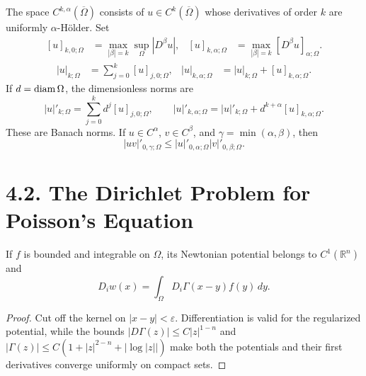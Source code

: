 \begin{definition}\label{gt:def-holder-spaces}
The space $C^{k,\alpha}(\overline\Omega)$ consists of
$u\in C^k(\overline\Omega)$ whose derivatives of order $k$ are uniformly
$\alpha$-H\"older. Set
\begin{equation}
\tag{4.5}
\begin{aligned}
[u]_{k,0;\Omega}&=\max_{|\beta|=k}\sup_\Omega|D^\beta u|,
& [u]_{k,\alpha;\Omega}&=\max_{|\beta|=k}[D^\beta u]_{\alpha;\Omega}.
\end{aligned}
\end{equation}
\begin{equation}
\tag{4.6}
\begin{aligned}
|u|_{k;\Omega}&=\sum_{j=0}^k[u]_{j,0;\Omega},
& |u|_{k,\alpha;\Omega}&=|u|_{k;\Omega}+[u]_{k,\alpha;\Omega}.
\end{aligned}
\end{equation}
If $d=\operatorname{diam}\Omega$, the dimensionless norms are
\[
|u|'_{k;\Omega}=\sum_{j=0}^k d^j[u]_{j,0;\Omega},
\qquad
|u|'_{k,\alpha;\Omega}=|u|'_{k;\Omega}
+d^{k+\alpha}[u]_{k,\alpha;\Omega}.
\tag{4.6'}
\]
These are Banach norms. If
$u\in C^\alpha$, $v\in C^\beta$, and $\gamma=\min(\alpha,\beta)$, then
\begin{equation}
\tag{4.7}
|uv|'_{0,\gamma;\Omega}
\leq |u|'_{0,\alpha;\Omega}|v|'_{0,\beta;\Omega}.
\end{equation}
\end{definition}

\section*{4.2. The Dirichlet Problem for Poisson's Equation}

\begin{lemma}\label{gt:lem-newtonian-c1}
If $f$ is bounded and integrable on $\Omega$, its Newtonian potential belongs
to $C^1(\mathbb R^n)$ and
\begin{equation}
\tag{4.8}
D_iw(x)=\int_\Omega D_i\Gamma(x-y)f(y)\,dy.
\end{equation}
\end{lemma}
\begin{proof}
\sketch Cut off the kernel on $|x-y|<\varepsilon$. Differentiation is valid
for the regularized potential, while the bounds
$|D\Gamma(z)|\leq C|z|^{1-n}$ and
$|\Gamma(z)|\leq C(1+|z|^{2-n}+|\log|z||)$ make both the potentials and
their first derivatives converge uniformly on compact sets.
\end{proof}

